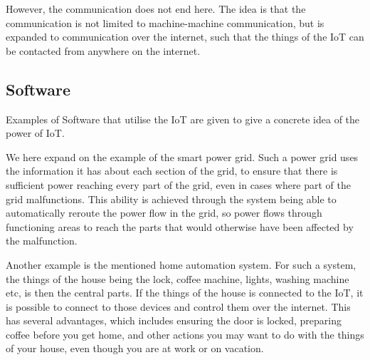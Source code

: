 However, the communication does not end here.
The idea is that the communication is not limited to machine-machine communication, but is expanded to communication over the internet, such that the things of the IoT can be contacted from anywhere on the internet.

\subsection{Software}
Examples of Software that utilise the IoT are given to give a concrete idea of the power of IoT.

We here expand on the example of the smart power grid.
Such a power grid uses the information it has about each section of the grid, to ensure that there is sufficient power reaching every part of the grid, even in cases where part of the grid malfunctions.
This ability is achieved through the system being able to automatically reroute the power flow in the grid, so power flows through functioning areas to reach the parts that would otherwise have been affected by the malfunction.

Another example is the mentioned home automation system.
For such a system, the things of the house being the lock, coffee machine, lights, washing machine etc, is then the central parts.
If the things of the house is connected to the IoT, it is possible to connect to those devices and control them over the internet.
This has several advantages, which includes ensuring the door is locked, preparing coffee before you get home, and other actions you may want to do with the things of your house, even though you are at work or on vacation.